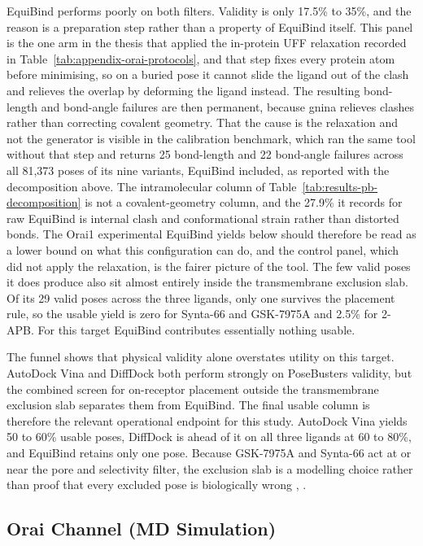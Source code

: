 EquiBind performs poorly on both filters. Validity is only 17.5\% to 35\%, and the reason is a preparation step rather than a property of EquiBind itself. This panel is the one arm in the thesis that applied the in-protein UFF relaxation recorded in Table~\ref{tab:appendix-orai-protocols}, and that step fixes every protein atom before minimising, so on a buried pose it cannot slide the ligand out of the clash and relieves the overlap by deforming the ligand instead. The resulting bond-length and bond-angle failures are then permanent, because gnina relieves clashes rather than correcting covalent geometry. That the cause is the relaxation and not the generator is visible in the calibration benchmark, which ran the same tool without that step and returns 25 bond-length and 22 bond-angle failures across all 81,373 poses of its nine variants, EquiBind included, as reported with the decomposition above. The intramolecular column of Table~\ref{tab:results-pb-decomposition} is not a covalent-geometry column, and the 27.9\% it records for raw EquiBind is internal clash and conformational strain rather than distorted bonds. The Orai1 experimental EquiBind yields below should therefore be read as a lower bound on what this configuration can do, and the control panel, which did not apply the relaxation, is the fairer picture of the tool. The few valid poses it does produce also sit almost entirely inside the transmembrane exclusion slab. Of its 29 valid poses across the three ligands, only one survives the placement rule, so the usable yield is zero for Synta-66 and GSK-7975A and 2.5\% for 2-APB. For this target EquiBind contributes essentially nothing usable.

The funnel shows that physical validity alone overstates utility on this target. AutoDock Vina and DiffDock both perform strongly on PoseBusters validity, but the combined screen for on-receptor placement outside the transmembrane exclusion slab separates them from EquiBind. The final usable column is therefore the relevant operational endpoint for this study. AutoDock Vina yields 50 to 60\% usable poses, DiffDock is ahead of it on all three ligands at 60 to 80\%, and EquiBind retains only one pose. Because GSK-7975A and Synta-66 act at or near the pore and selectivity filter, the exclusion slab is a modelling choice rather than proof that every excluded pose is biologically wrong \cite{ref070}, \cite{ref071}.

\hypertarget{orai-channel-md-simulation}{%
\subsection{\texorpdfstring{Orai Channel (MD Simulation)}{Orai Channel (MD Simulation)}}\label{orai-channel-md-simulation}}


